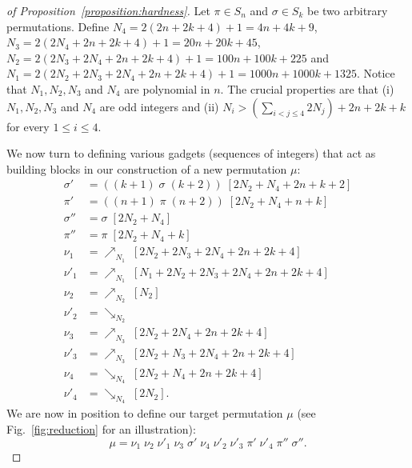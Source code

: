 \documentclass[a4paper]{llncs}
\begin{document}
\begin{proof}[of Proposition~\ref{proposition:hardness}]
  Let $\pi \in S_n$ and $\sigma \in S_k$ be two arbitrary permutations.
  Define
  $N_4 = 2(2n + 2k + 4) + 1  = 4n + 4k + 9$,
  $N_3 = 2(2N_4 + 2n + 2k + 4) + 1 = 20n + 20k + 45$,
  $N_2 = 2(2N_3 + 2N_4 + 2n + 2k + 4) + 1 = 100n + 100k + 225$ and
  $N_1 = 2(2N_2 + 2N_3 + 2N_4 + 2n + 2k + 4) + 1 = 1000n + 1000k  + 1325$.
  Notice that $N_1, N_2, N_3$ and $N_4$ are polynomial in $n$.
  The crucial properties are that
  (i) $N_1, N_2, N_3$ and $N_4$ are odd integers
  and
  (ii) $N_i > \left(\sum_{i < j \leq 4} 2N_j\right) + 2n + 2k + k$
  for every $1 \leq i \leq 4$.

  We now turn to defining various gadgets (sequences of integers)
  that act as building blocks in our construction of a new permutation $\mu$:
  \begin{align*}
  \sigma'  &= ((k+1) \; \sigma \; (k+2)) \; [2N_2 + N_4 + 2n + k + 2] \\
  \pi'     &= ((n+1) \; \pi \; (n+2)) \; [2N_2 + N_4 + n + k] \\
  \sigma'' &= \sigma \; [2N_2 + N_4] \\
  \pi''    &= \pi \; [2N_2 + N_4 + k] \\
  \nu_1    &= \nearrow_{N_1} \; [2N_2 + 2N_3 + 2N_4 + 2n + 2k + 4] \\
  \nu'_1   &= \nearrow_{N_1} \; [N_1 + 2N_2 + 2N_3 + 2N_4 + 2n + 2k + 4] \\
  \nu_2    &= \nearrow_{N_2} \; [N_2] \\
  \nu'_2   &= \searrow_{N_2} \\
  \nu_3    &= \nearrow_{N_3} \; [2N_2 + 2N_4 + 2n + 2k + 4] \\
  \nu'_3   &= \nearrow_{N_3} \; [2N_2 + N_3 + 2N_4 + 2n + 2k + 4] \\
  \nu_4    &= \searrow_{N_4} \; [2N_2 + N_4 + 2n + 2k + 4] \\
  \nu'_4   &= \searrow_{N_4} \; [2N_2]\text{.}
  \end{align*}
  We are now in position to define our target permutation $\mu$
  (see Fig.~\ref{fig:reduction} for an illustration):
  $$
  \mu
  =
  \nu_1 \; \nu_2 \; \nu'_1 \; \nu_3 \; \sigma' \; \nu_4 \; \nu'_2 \; \nu'_3 \; \pi' \; \nu'_4 \; \pi'' \; \sigma''
  \text{.}
  $$


\end{proof}
\end{document}
